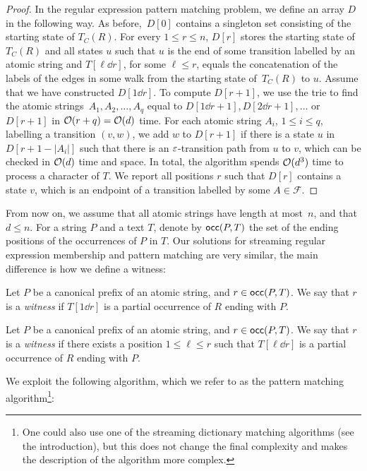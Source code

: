 \begin{proof}
In the regular expression pattern matching problem, we define an array $D$ in the following way. As before,~$D[0]$ contains a singleton set consisting of the starting state of $T_C(R)$. For every $1 \le r \le n$, $D[r]$ stores the starting state of $T_C(R)$ and all states $u$ such that $u$ is the end of some transition labelled by an atomic string and $T[\ell \dd r]$, for some $\ell \le r$, equals the concatenation of the labels of the edges in some walk from the starting state of~$T_C(R)$ to $u$. Assume that we have constructed $D[1\dd r]$. To compute $D[r+1]$, we use the trie to find the atomic strings~$A_1, A_2, \ldots, A_q$ equal to $D[1\dd r+1], D[2\dd r+1], \ldots$  or $D[r+1]$ in $\mathcal{O}(r+q) = \mathcal{O}(d)$ time. For each atomic string $A_i$, $1 \le i \le q$, labelling a transition $(v,w)$, we add $w$ to $D[r+1]$ if there is a state $u$ in $D[r+1-|A_i|]$ such that there is an $\varepsilon$-transition path from $u$ to $v$, which can be checked in $\mathcal{O}(d)$ time and space. In total, the algorithm spends $\mathcal{O}(d^3)$ time to process a character of $T$. We report all positions $r$ such that $D[r]$ contains a state $v$, which is an endpoint of a transition labelled by some $A\in \mathcal{F}$.
\end{proof}

From now on, we assume that all atomic strings have length at most~$n$, and that $d \le n$. 
For a string $P$ and a text $T$, denote by $\mathsf{occ}(P,T)$ the set of the ending positions of the occurrences of $P$ in $T$. Our solutions for streaming regular expression membership and pattern matching are very similar, the main difference is how we define a witness:

\begin{definition}\label{def:witness-memb}
Let $P$ be a canonical prefix of an atomic string, and $r \in \mathsf{occ}(P,T)$. 
We say that $r$ is a \emph{witness} if $T[1 \dd r]$ is a partial occurrence of $R$ ending with $P$.  
\end{definition}

\begin{definition}\label{def:witness-matching}
Let $P$ be a canonical prefix of an atomic string, and $r \in \mathsf{occ}(P,T)$. 
We say that $r$ is a \emph{witness} if there exists a position $1 \le \ell \le r$ such that $T[\ell \dd r]$ is a partial occurrence of $R$ ending with $P$.  
\end{definition}

\noindent
We exploit the following algorithm, which we refer to as the pattern matching algorithm\footnote{One could also use one of the streaming dictionary matching algorithms (see the introduction), but this does not change the final complexity and makes the description of the algorithm more complex.}:

